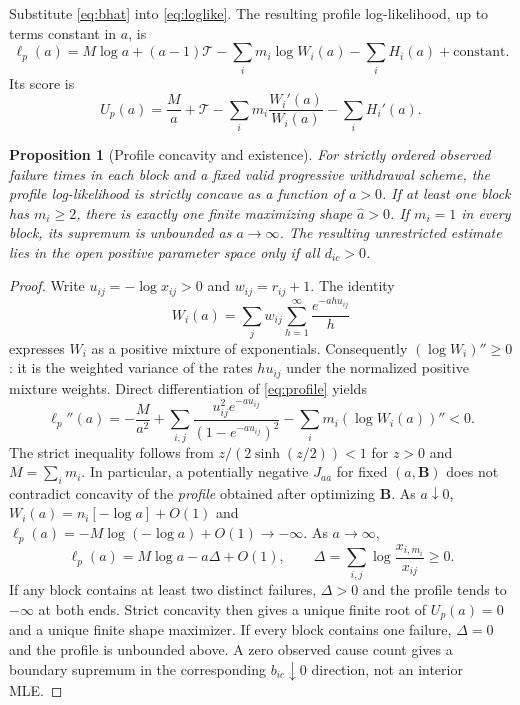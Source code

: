 \documentclass[a4paper,11pt]{article}
\newtheorem{proposition}{Proposition}[section]
\begin{document}
Substitute \eqref{eq:bhat} into \eqref{eq:loglike}. The resulting profile log-likelihood, up to terms constant in $a$, is
\begin{equation}\label{eq:profile}
\ell_p(a)=M\log a+(a-1)\mathcal{T}-\sum_i m_i\log W_i(a)-\sum_i H_i(a)+\text{constant}.
\end{equation}
Its score is
\begin{equation}\label{eq:profilescore}
U_p(a)=\frac{M}{a}+\mathcal{T}-\sum_i m_i\frac{W_i'(a)}{W_i(a)}-\sum_iH_i'(a).
\end{equation}
\begin{proposition}[Profile concavity and existence]\label{prop:profile}
For strictly ordered observed failure times in each block and a fixed valid progressive withdrawal scheme, the profile log-likelihood is strictly concave as a function of $a>0$. If at least one block has $m_i\geq 2$, there is exactly one finite maximizing shape $\widehat a>0$. If $m_i=1$ in every block, its supremum is unbounded as $a\to\infty$. The resulting unrestricted estimate lies in the open positive parameter space only if all $d_{ic}>0$.
\end{proposition}
\begin{proof}
Write $u_{ij}=-\log x_{ij}>0$ and $w_{ij}=r_{ij}+1$. The identity
\[
W_i(a)=\sum_jw_{ij}\sum_{h=1}^{\infty}\frac{e^{-ahu_{ij}}}{h}
\]
expresses $W_i$ as a positive mixture of exponentials. Consequently $(\log W_i)''\geq0$: it is the weighted variance of the rates $hu_{ij}$ under the normalized positive mixture weights. Direct differentiation of \eqref{eq:profile} yields
\begin{equation}\label{eq:profile-concavity}
\ell_p''(a)=-\frac{M}{a^2}+\sum_{i,j}\frac{u_{ij}^2e^{-au_{ij}}}{(1-e^{-au_{ij}})^2}-\sum_i m_i(\log W_i(a))''<0.
\end{equation}
The strict inequality follows from $z/(2\sinh(z/2))<1$ for $z>0$ and $M=\sum_im_i$. In particular, a potentially negative $J_{aa}$ for fixed $(a,\mathbf B)$ does not contradict concavity of the \emph{profile} obtained after optimizing $\mathbf B$.
As $a\downarrow0$, $W_i(a)=n_i[-\log a]+O(1)$ and $\ell_p(a)=-M\log(-\log a)+O(1)\to-\infty$. As $a\to\infty$,
\[
\ell_p(a)=M\log a-a\Delta+O(1),\qquad
\Delta=\sum_{i,j}\log\!\frac{x_{i,m_i}}{x_{ij}}\geq0.
\]
If any block contains at least two distinct failures, $\Delta>0$ and the profile tends to $-\infty$ at both ends. Strict concavity then gives a unique finite root of $U_p(a)=0$ and a unique finite shape maximizer. If every block contains one failure, $\Delta=0$ and the profile is unbounded above. A zero observed cause count gives a boundary supremum in the corresponding $b_{ic}\downarrow0$ direction, not an interior MLE.
\end{proof}
\end{document}
